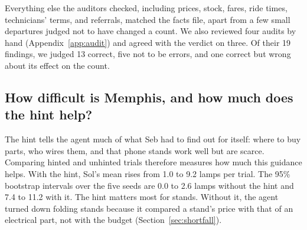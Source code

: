 \documentclass[10pt]{article}
\begin{document}
Everything else the auditors checked, including prices, stock, fares, ride times, technicians' terms, and referrals, matched the facts file, apart from a few small departures judged not to have changed a count. We also reviewed four audits by hand (Appendix~\ref{app:audit}) and agreed with the verdict on three. Of their 19 findings, we judged 13 correct, five not to be errors, and one correct but wrong about its effect on the count.

\subsection{How difficult is Memphis, and how much does the hint help?}

The hint tells the agent much of what Seb had to find out for itself: where to buy parts, who wires them, and that phone stands work well but are scarce. Comparing hinted and unhinted trials therefore measures how much this guidance helps. With the hint, Sol's mean rises from 1.0 to 9.2 lamps per trial. The 95\% bootstrap intervals over the five seeds are 0.0 to 2.6 lamps without the hint and 7.4 to 11.2 with it. The hint matters most for stands. Without it, the agent turned down folding stands because it compared a stand's price with that of an electrical part, not with the budget (Section~\ref{sec:shortfall}).
\end{document}
